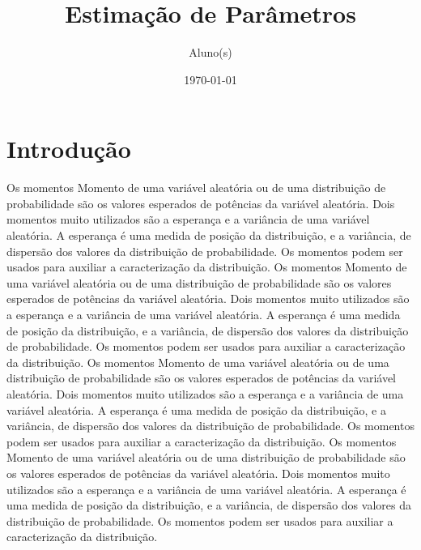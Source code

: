 \documentclass[12pt]{article}
\title{Estimação de Parâmetros}
\author{Aluno(s)}
\date{\today{}}
\begin{document}
\maketitle

\thispagestyle{empty}
 

\section{Introdução}
Os momentos Momento de uma variável aleatória ou de uma distribuição de probabilidade são os valores esperados de potências da variável aleatória. Dois momentos muito utilizados são a esperança e a variância de uma variável aleatória. A esperança é uma medida de posição da distribuição, e a variância, de dispersão dos valores da distribuição de probabilidade. Os momentos podem ser usados para auxiliar a caracterização da distribuição.
Os momentos Momento de uma variável aleatória ou de uma distribuição de probabilidade são os valores esperados de potências da variável aleatória. Dois momentos muito utilizados são a esperança e a variância de uma variável aleatória. A esperança é uma medida de posição da distribuição, e a variância, de dispersão dos valores da distribuição de probabilidade. Os momentos podem ser usados para auxiliar a caracterização da distribuição.
Os momentos Momento de uma variável aleatória ou de uma distribuição de probabilidade são os valores esperados de potências da variável aleatória. Dois momentos muito utilizados são a esperança e a variância de uma variável aleatória. A esperança é uma medida de posição da distribuição, e a variância, de dispersão dos valores da distribuição de probabilidade. Os momentos podem ser usados para auxiliar a caracterização da distribuição.
Os momentos Momento de uma variável aleatória ou de uma distribuição de probabilidade são os valores esperados de potências da variável aleatória. Dois momentos muito utilizados são a esperança e a variância de uma variável aleatória. A esperança é uma medida de posição da distribuição, e a variância, de dispersão dos valores da distribuição de probabilidade. Os momentos podem ser usados para auxiliar a caracterização da distribuição.
\end{document}
